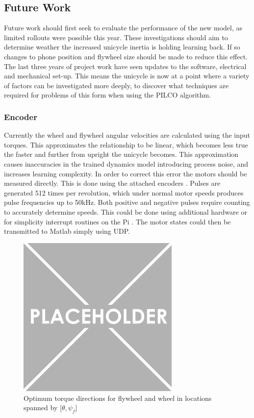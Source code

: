 \documentclass[twoside,twocolumn,12pt]{article}
\begin{document}
\subsection{Future Work}
Future work should first seek to evaluate the performance of the new model, as limited rollouts were possible this year. These investigations should aim to determine weather the increased unicycle inertia is holding learning back. If so changes to phone position and flywheel size should be made to reduce this effect.
\newline
The last three years of project work have seen updates to the software, electrical and mechanical set-up. This means the unicycle is now at a point where a variety of factors can be investigated more deeply, to discover what techniques are required for problems of this form when using the PILCO algorithm. 
\subsubsection{Encoder}
Currently the wheel and flywheel angular velocities are calculated using the input torques. This approximates the relationship to be linear, which becomes less true the faster and further from upright the unicycle becomes. This approximation causes inaccuracies in the trained dynamics model introducing process noise, and increases learning complexity. 
\newline
In order to correct this error the motors should be measured directly. This is done using the attached encoders \cite{encoder}. Pulses are generated 512 times per revolution, which under normal motor speeds produces pulse frequencies up to 50kHz.
\newline
Both positive and negative pulses require counting to accurately determine speeds. This could be done using additional hardware or for simplicity interrupt routines on the Pi \cite{interrupt}. The motor states could then be transmitted to Matlab simply using UDP.
\begin{figure}
  \centering
    \includegraphics[width=\linewidth,height = 8cm]{place}
  \caption{Optimum torque directions for flywheel and wheel in locations spanned by [$\theta ,\psi_f$]}
  \label{fig:quad}
\end{figure} 
\end{document}

